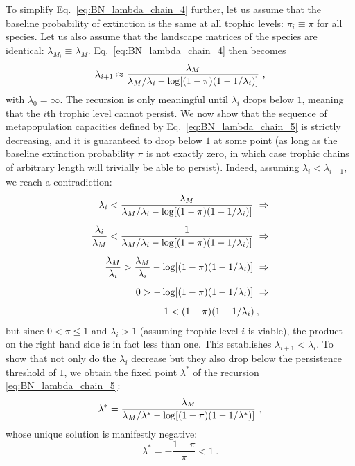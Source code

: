 \documentclass[11pt]{article}
\let\originalleft\left
\let\originalright\right
\renewcommand{\left}{\mathopen{}\mathclose\bgroup\originalleft}
\renewcommand{\right}{\aftergroup\egroup\originalright}
\begin{document}
To simplify Eq.~\ref{eq:BN_lambda_chain_4} further, let us assume that the baseline probability of extinction is the same at all trophic levels: $\pi_i \equiv \pi$ for all species. Let us also assume that the landscape matrices of the species are identical: $\lambda_{M_i} \equiv \lambda_M$. Eq.~\ref{eq:BN_lambda_chain_4} then becomes
\begin{equation}
  \label{eq:BN_lambda_chain_5}
  \lambda_{i+1} \approx \frac{\lambda_M}{\lambda_M / \lambda_i -\log \left[ (1 -
      \pi) (1-1/\lambda_i) \right]} \ ,
\end{equation}
with $\lambda_0 = \infty$. The recursion is only meaningful until $\lambda_i$ drops below $1$, meaning that the $i$th trophic level cannot persist. We now show that the sequence of metapopulation capacities defined by Eq.~\ref{eq:BN_lambda_chain_5} is strictly decreasing, and it is guaranteed to drop below $1$ at some point (as long as the baseline extinction probability $\pi$ is not exactly zero, in which case trophic chains of arbitrary length will trivially be able to persist). Indeed, assuming $\lambda_i < \lambda_{i+1}$, we reach a contradiction:
\begin{equation}
  \label{eq:BN_lambda_chain_6}
  \begin{split}
    \lambda_i < \frac{\lambda_M}{\lambda_M / \lambda_i -
      \log \left[ (1 - \pi) (1-1/\lambda_i) \right]} \ \Rightarrow \\[0.5em]
    \frac{\lambda_i}{\lambda_M} < \frac{1}{\lambda_M / \lambda_i -
      \log \left[ (1 - \pi) (1-1/\lambda_i) \right]} \ \Rightarrow \\[0.5em]
    \frac{\lambda_M}{\lambda_i} > \frac{\lambda_M}{\lambda_i} -
    \log \left[ (1 - \pi) (1-1/\lambda_i) \right] \ \Rightarrow \\[0.5em]
    0 > -\log \left[ (1 - \pi) (1-1/\lambda_i) \right]
    \ \Rightarrow \\[0.5em]
    1 < (1 - \pi) (1-1/\lambda_i) \: , \quad
  \end{split}
\end{equation}
but since $0 < \pi \le 1$ and $\lambda_i > 1$ (assuming trophic level $i$ is viable), the product on the right hand side is in fact less than one. This establishes $\lambda_{i+1} < \lambda_i$. To show that not only do the $\lambda_i$ decrease but they also drop below the persistence threshold of $1$, we obtain the fixed point $\lambda^*$ of the recursion \ref{eq:BN_lambda_chain_5}:
\begin{equation}
  \label{eq:BN_lambda_chain_7}
  \lambda^* = \frac{\lambda_M}{\lambda_M / \lambda^* -
    \log \left[ (1 - \pi) (1-1/\lambda^*) \right]} \ ,
\end{equation}
whose unique solution is manifestly negative:
\begin{equation}
  \label{eq:BN_lambda_chain_8}
  \lambda^* = - \frac{1 - \pi}{\pi} < 1 \ .
\end{equation}
\end{document}
